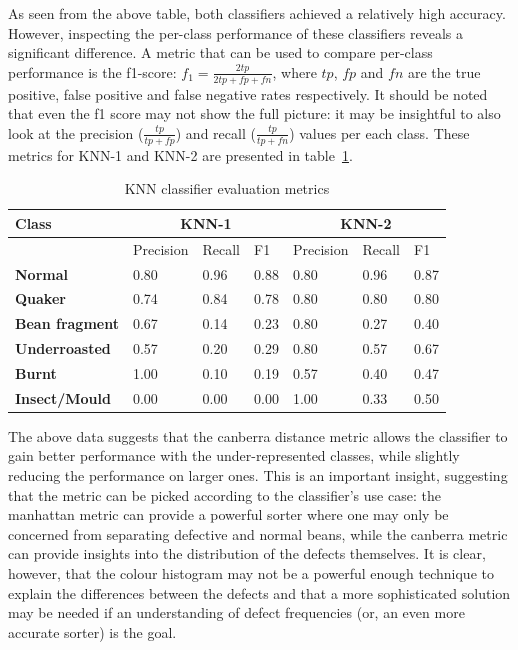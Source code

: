 As seen from the above table, both classifiers achieved a relatively high accuracy.
However, inspecting the per-class performance of these classifiers reveals a significant difference.
A metric that can be used to compare per-class performance is the f1-score:
$f_1 = \frac{2tp}{2tp + fp + fn}$, where $tp$, $fp$ and $fn$ are the true positive, false positive and false negative rates respectively.
It should be noted that even the f1 score may not show the full picture: it may be insightful to also look at the precision
($\frac{tp}{tp + fp}$) and recall ($\frac{tp}{tp + fn}$) values per each class.
These metrics for KNN-1 and KNN-2 are presented in table~\ref{tab:knnScores}.
\begin{table}
    \centering
    \begin{tabular}{*7l}
        \toprule
        \textbf{Class} & \multicolumn{3}{c}{KNN-1} & \multicolumn{3}{c}{KNN-2} \\
        \midrule
        {} & Precision & Recall & F1 & Precision & Recall & F1 \\
            \textbf{Normal} & 0.80 & 0.96 & 0.88 & 0.80 & 0.96 & 0.87  \\
            \textbf{Quaker} & 0.74 & 0.84 & 0.78 & 0.80 & 0.80 & 0.80 \\
            \textbf{Bean fragment} & 0.67 & 0.14 & 0.23 & 0.80 & 0.27 & 0.40 \\
            \textbf{Underroasted} & 0.57 & 0.20 & 0.29 & 0.80 & 0.57 & 0.67 \\
            \textbf{Burnt} & 1.00 & 0.10 & 0.19 & 0.57 & 0.40 & 0.47 \\
            \textbf{Insect/Mould} & 0.00 & 0.00 & 0.00 & 1.00 & 0.33 & 0.50  \\
        \bottomrule
    \end{tabular}
    \caption{KNN classifier evaluation metrics}
    \label{tab:knnScores}
\end{table}

The above data suggests that the canberra distance metric allows the classifier to gain better
performance with the under-represented classes, while slightly reducing the performance on larger ones.
This is an important insight, suggesting that the metric can be picked according to the classifier's use case:
the manhattan metric can provide a powerful sorter where one may only be concerned from separating defective and normal beans,
while the canberra metric can provide insights into the distribution of the defects themselves.
It is clear, however, that the colour histogram may not be a powerful enough technique to explain the differences between
the defects and that a more sophisticated solution may be needed if an understanding of defect frequencies (or, an even more accurate sorter)
is the goal.


